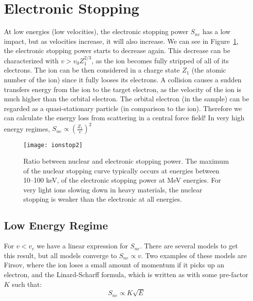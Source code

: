 \section{Electronic Stopping}\label{sec:electronic-stopping}
At low energies (low velocities), the electronic stopping power $S_{ne}$ has a low impact, but as velocities increase, it will also increase.
We can see in Figure~\ref{fig:ionstop2}, the electronic stopping power starts to decrease again.
This decrease can be characterized with $v > v_0 Z_1^{2/3}$, as the ion becomes fully stripped of all of its electrons.
The ion can be then considered in a charge state $Z_1$ (the atomic number of the ion) since it fully looses its electrons.
A collision causes a sudden transfers energy from the ion to the target electron, as the velocity of the ion is much higher than the orbital electron.
The orbital electron (in the sample) can be regarded as a quasi-stationary particle (in comparison to the ion).
Therefore we can calculate the energy loss from scattering in a central force field!
In very high energy regimes, $S_{ne} \propto \left( \frac{Z_1}{v}\right)^2$
\begin{figure}
	\centering
	\texttt{[image: ionstop2]}
	\caption{Ratio between nuclear and electronic stopping power. The maximum of the nuclear stopping curve typically occurs at energies between 10--100 keV, of the electronic stopping power at MeV energies. For very light ions slowing down in heavy materials, the nuclear stopping is weaker than the electronic at all energies. \cite{4}}
	\label{fig:ionstop2}
\end{figure}

\subsection{Low Energy Regime}\label{subsec:low-energy-regime}
For $v < v_e$ we have a linear expression for $S_{ne}$.
There are several models to get this result, but all models converge to $S_{ne} \propto v$.
Two examples of these models are Firsov, where the ion loses a small amount of momentum if it picks up an electron, and the Linard-Scharff formula, which is written as with some pre-factor $K$ such that: $$S_{ne} \propto K \sqrt{E}$$
